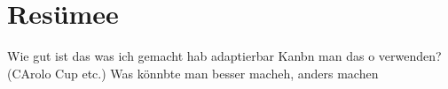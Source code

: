 %
\chapter{Resümee}


Wie gut ist das was ich gemacht hab adaptierbar
Kanbn man das o verwenden? (CArolo Cup etc.)
Was könnbte man besser macheh, anders machen 